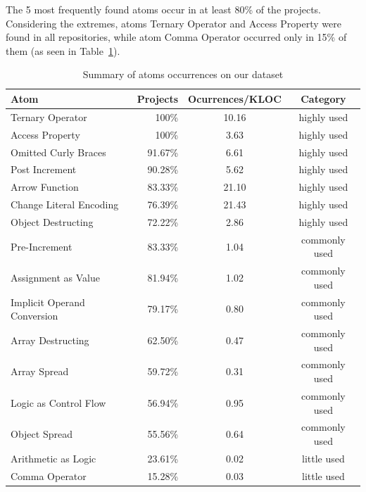 The 5 most frequently found atoms occur in at least 80\% of the projects.
Considering the extremes, atoms Ternary Operator and Access Property were found in all repositories, while atom Comma Operator occurred only in 15\% of them (as seen in Table~\ref{tab:occurrences-summary}).




\begin{table}[!htb]
\centering
 \caption{Summary of atoms occurrences on our dataset}
 
\setlength\tabcolsep{2pt} %
\label{tab:occurrences-summary}
\begin{tabular}{lrcc}

  \hline
Atom & Projects & Ocurrences/KLOC & Category \\ 
 \hline
Ternary Operator & 100\% & 10.16 &  highly used \\ 
  Access Property & 100\% & 3.63 &  highly used \\ 
  Omitted Curly Braces & 91.67\% & 6.61 &  highly used \\ 
  Post Increment & 90.28\% & 5.62 &  highly used \\ 
  Arrow Function & 83.33\% & 21.10 &  highly used \\ 
  Change Literal Encoding & 76.39\% & 21.43 &  highly used \\ 
  Object Destructing & 72.22\% & 2.86 &  highly used \\ 
  Pre-Increment & 83.33\% & 1.04 & commonly used \\ 
  Assignment as Value & 81.94\% & 1.02 & commonly used \\ 
  Implicit Operand Conversion & 79.17\% & 0.80 & commonly used \\ 
  Array Destructing & 62.50\% & 0.47 & commonly used \\ 
  Array Spread & 59.72\% & 0.31 & commonly used \\ 
  Logic as Control Flow & 56.94\% & 0.95 & commonly used \\ 
  Object Spread & 55.56\% & 0.64 & commonly used \\ 
  Arithmetic as Logic & 23.61\% & 0.02 & little used \\ 
  Comma Operator & 15.28\% & 0.03 & little used \\ 
   \hline
\end{tabular}
\end{table}


